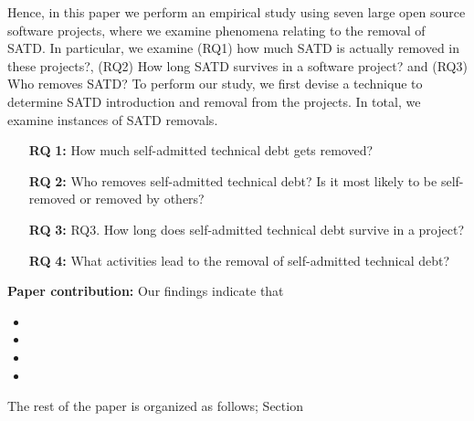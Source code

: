Hence, in this paper we perform an empirical study using seven large open source software projects, where we examine phenomena relating to the removal of SATD. In particular, we examine (RQ1) how much SATD is actually removed in these projects?, (RQ2) How long SATD survives in a software project? and (RQ3) Who removes SATD? To perform our study, we first devise a technique to determine SATD introduction and removal from the projects. In total, we examine  instances of SATD removals.
\begin{itemize}
	\item[\textbf{RQ}]\textbf{1:} How much self-admitted technical debt gets removed?
	\item[\textbf{RQ}]\textbf{2:} Who removes self-admitted technical debt? Is it most likely to be self-removed or removed by others?
	\item[\textbf{RQ}]\textbf{3:} RQ3. How long does self-admitted technical debt survive in a project?
	\item[\textbf{RQ}]\textbf{4:} What activities lead to the removal of self-admitted technical debt?
	
\end{itemize}

\textbf{Paper contribution:} Our findings indicate that 
\begin{itemize}
	\item 
	\item 
	\item
	\item
\end{itemize}

The rest of the paper is organized as follows; Section 





